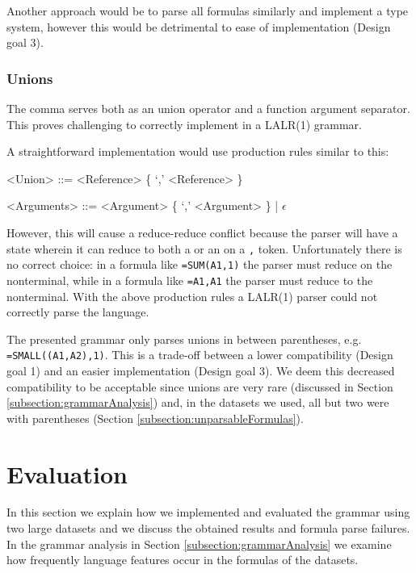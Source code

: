\documentclass[conference]{IEEEtran}
\begin{document}
Another approach would be to parse all formulas similarly and implement a type system, however this would be detrimental to ease of implementation (Design goal 3).

\subsubsection{\textbf{Unions}}
\label{subsec:desing:unions}

The comma serves both as an union operator and a function argument separator.
This proves challenging to correctly implement in a LALR(1) grammar.

A straightforward implementation would use production rules similar to this:
\begin{grammar}
<Union> ::= <Reference> \{ `,' <Reference> \}

<Arguments> ::= <Argument> \{ `,' <Argument> \} | $\epsilon$
\end{grammar}

However, this will cause a reduce-reduce conflict because the parser will have a state wherein it can reduce to both a  or an  on a \texttt{,} token.
Unfortunately there is no correct choice: in a formula like \texttt{=SUM(A1,1)} the parser must reduce on the  nonterminal, while in a formula like \texttt{=A1,A1} the parser must reduce to the  nonterminal.
With the above production rules a LALR(1) parser could not correctly parse the language.

The presented grammar only parses unions in between parentheses, e.g. \texttt{=SMALL((A1,A2),1)}.
This is a trade-off between a lower compatibility (Design goal 1) and an easier implementation (Design goal 3).
We deem this decreased compatibility to be acceptable since unions are very rare (discussed in Section \ref{subsection:grammarAnalysis}) and, in the datasets we used, all but two were with parentheses (Section \ref{subsection:unparsableFormulas}).

\section{Evaluation}
\label{sec:evaluation}

In this section we explain how we implemented and evaluated the grammar using two large datasets and we discuss the obtained results and formula parse failures. In the grammar analysis in Section \ref{subsection:grammarAnalysis} we examine how frequently language features occur in the formulas of the datasets.
\end{document}
